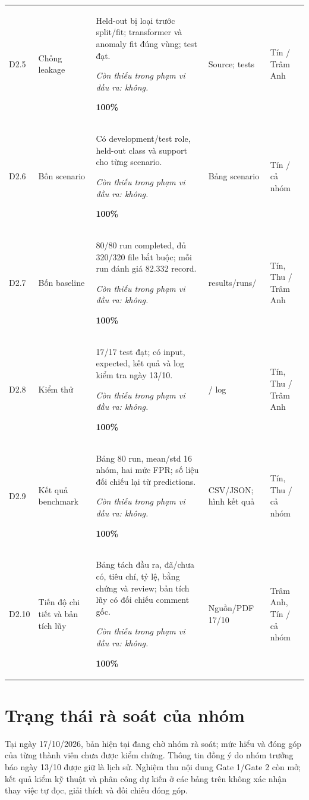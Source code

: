 \documentclass[12pt,a4paper,oneside]{report}
\begin{document}
\begin{longtable}{L{1cm}L{2.5cm}L{7.2cm}L{2.3cm}L{2.6cm}}
D2.5 & Chống leakage & Held-out bị loại trước split/fit; transformer và anomaly fit đúng vùng; test đạt.\par\textit{Còn thiếu trong phạm vi đầu ra: không.}\par\textbf{100\%} & Source; tests & Tín / Trâm Anh\\
D2.6 & Bốn scenario & Có development/test role, held-out class và support cho từng scenario.\par\textit{Còn thiếu trong phạm vi đầu ra: không.}\par\textbf{100\%} & Bảng scenario & Tín / cả nhóm\\
D2.7 & Bốn baseline & 80/80 run completed, đủ 320/320 file bắt buộc; mỗi run đánh giá 82.332 record.\par\textit{Còn thiếu trong phạm vi đầu ra: không.}\par\textbf{100\%} & results/runs/ & Tín, Thu / Trâm Anh\\
D2.8 & Kiểm thử & 17/17 test đạt; có input, expected, kết quả và log kiểm tra ngày 13/10.\par\textit{Còn thiếu trong phạm vi đầu ra: không.}\par\textbf{100\%} &  / log & Tín, Thu / Trâm Anh\\
D2.9 & Kết quả benchmark & Bảng 80 run, mean/std 16 nhóm, hai mức FPR; số liệu đối chiếu lại từ predictions.\par\textit{Còn thiếu trong phạm vi đầu ra: không.}\par\textbf{100\%} & CSV/JSON; hình kết quả & Tín, Thu / cả nhóm\\
D2.10 & Tiến độ chi tiết và bản tích lũy & Bảng tách đầu ra, đã/chưa có, tiêu chí, tỷ lệ, bằng chứng và review; bản tích lũy có đối chiếu comment gốc.\par\textit{Còn thiếu trong phạm vi đầu ra: không.}\par\textbf{100\%} & Nguồn/PDF 17/10 & Trâm Anh, Tín / cả nhóm\\
\bottomrule\end{longtable}\endgroup

\section{Trạng thái rà soát của nhóm}\label{sec:teamreview}
Tại ngày 17/10/2026, bản hiện tại đang chờ nhóm rà soát; mức hiểu và đóng góp của từng thành viên chưa được kiểm chứng. Thông tin đồng ý do nhóm trưởng báo ngày 13/10 được giữ là lịch sử. Nghiệm thu nội dung Gate 1/Gate 2 còn mở; kết quả kiểm kỹ thuật và phân công dự kiến ở các bảng trên không xác nhận thay việc tự đọc, giải thích và đối chiếu đóng góp.
\end{document}
